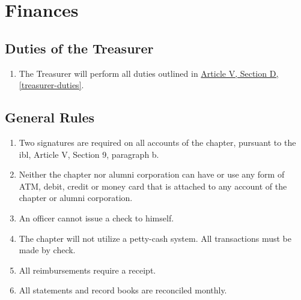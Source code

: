 \documentclass[]{article}
\begin{document}
\chapter{Finances}

\section{Duties of the Treasurer}
	\begin{enumerate}
		\item The Treasurer will perform all duties outlined in \hyperref[treasurer-duties]{Article V, Section D, \autoref*{treasurer-duties}}. 
	\end{enumerate}

\section{General Rules}
	\label{fin-rules}
	\begin{enumerate}
		\item Two signatures are required on all accounts of the chapter, pursuant to the \gls{ibl}, Article V, Section 9, paragraph b.
		\item Neither the chapter nor alumni corporation can have or use any form of ATM, debit, credit or money card that is attached to any account of the chapter or alumni corporation.
		\item An officer cannot issue a check to himself.
		\item The chapter will not utilize a petty-cash system. All transactions must be made by
		check.
		\item All reimbursements require a receipt.
		\item All statements and record books are reconciled monthly.
	\end{enumerate}
\end{document}
